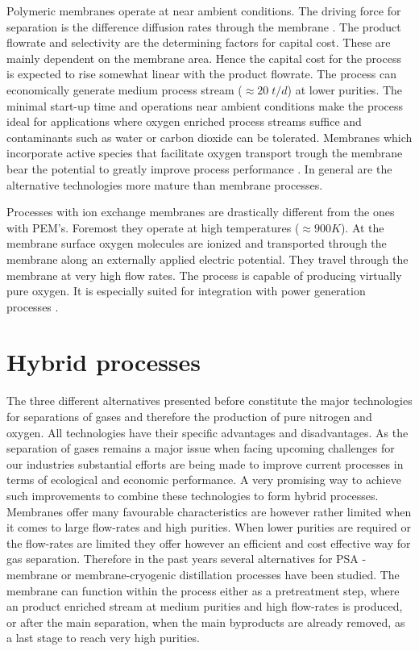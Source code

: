     Polymeric membranes operate at near ambient conditions. The driving force for separation is the difference 
    diffusion rates through the membrane \cite{Melin.2007}. The product flowrate and selectivity are the 
    determining factors for capital cost. These are mainly dependent on the membrane area. Hence
    the capital cost for the process is expected to rise somewhat linear with the product flowrate.
    The process can economically generate medium process stream ($\approx 20 \; t/d$) at lower purities. 
    The minimal start-up time and operations near ambient conditions make the process ideal for
    applications where oxygen enriched process streams suffice and contaminants such as water or carbon 
    dioxide can be tolerated. Membranes which incorporate active species that facilitate oxygen transport
    trough the membrane bear the potential to greatly improve process performance \cite{Kammermeyer.1976}. 
    In general are the alternative technologies more mature than membrane processes. 
    
    Processes with ion exchange membranes are drastically different from the ones with PEM's. Foremost they
    operate at high temperatures ($\approx 900 K$). At the membrane surface oxygen molecules are ionized 
    and transported through the membrane along an externally applied electric potential. They travel 
    through the membrane at very high flow rates. The process is capable of producing virtually pure 
    oxygen. It is especially suited for integration with power generation processes \cite{Smith.2001}.    
    
    \section{Hybrid processes}
    The three different alternatives presented before constitute the major technologies for separations
    of gases and therefore the production of pure nitrogen and oxygen. All technologies have their specific
    advantages and disadvantages. As the separation of gases remains a major issue when facing upcoming challenges
    for our industries substantial efforts are being made to improve current processes in terms of ecological
    and economic performance. A very promising way to achieve such improvements to combine these technologies
    to form hybrid processes. Membranes offer many favourable characteristics are however rather limited when
    it comes to large flow-rates and high purities. When lower purities are required or the flow-rates are limited
    they offer however an efficient and cost effective way for gas separation. Therefore in the past years several
    alternatives for PSA - membrane \cite{Akinlabi.2007} or membrane-cryogenic distillation processes \cite{Wankat.2011}
    have been studied. The membrane can function within the process either as a pretreatment step, where an product enriched
    stream at medium purities and high flow-rates is produced, or after the main separation, when the main
    byproducts are already removed, as a last stage to reach very high purities.
